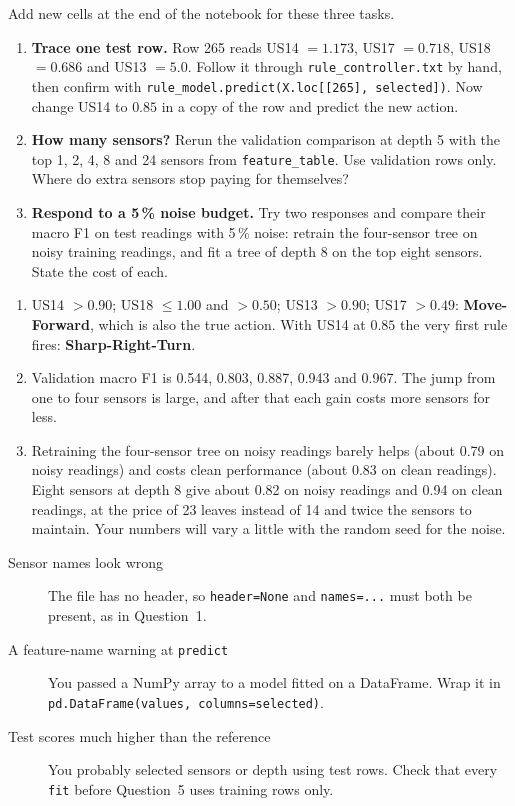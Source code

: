 \begin{yourturn}
Add new cells at the end of the notebook for these three tasks.
\begin{enumerate}
  \item \textbf{Trace one test row.} Row 265 reads US14 $=1.173$, US17 $=0.718$, US18 $=0.686$ and US13 $=5.0$. Follow it through \texttt{rule\_controller.txt} by hand, then confirm with \texttt{rule\_model.predict(X.loc[[265], selected])}. Now change US14 to $0.85$ in a copy of the row and predict the new action.
  \item \textbf{How many sensors?} Rerun the validation comparison at depth 5 with the top 1, 2, 4, 8 and 24 sensors from \texttt{feature\_table}. Use validation rows only. Where do extra sensors stop paying for themselves?
  \item \textbf{Respond to a 5\,\% noise budget.} Try two responses and compare their macro F1 on test readings with 5\,\% noise: retrain the four-sensor tree on noisy training readings, and fit a tree of depth 8 on the top eight sensors. State the cost of each.
\end{enumerate}
\end{yourturn}

\begin{expectedfindings}
\begin{enumerate}
  \item US14 $>0.90$; US18 $\le1.00$ and $>0.50$; US13 $>0.90$; US17 $>0.49$: \textbf{Move-Forward}, which is also the true action. With US14 at $0.85$ the very first rule fires: \textbf{Sharp-Right-Turn}.
  \item Validation macro F1 is 0.544, 0.803, 0.887, 0.943 and 0.967. The jump from one to four sensors is large, and after that each gain costs more sensors for less.
  \item Retraining the four-sensor tree on noisy readings barely helps (about 0.79 on noisy readings) and costs clean performance (about 0.83 on clean readings). Eight sensors at depth 8 give about 0.82 on noisy readings and 0.94 on clean readings, at the price of 23 leaves instead of 14 and twice the sensors to maintain. Your numbers will vary a little with the random seed for the noise.
\end{enumerate}
\end{expectedfindings}

\begin{troubleshoot}
\begin{description}
  \item[Sensor names look wrong] The file has no header, so \texttt{header=None} and \texttt{names=...} must both be present, as in Question~1.
  \item[A feature-name warning at \texttt{predict}] You passed a NumPy array to a model fitted on a DataFrame. Wrap it in \texttt{pd.DataFrame(values, columns=selected)}.
  \item[Test scores much higher than the reference] You probably selected sensors or depth using test rows. Check that every \texttt{fit} before Question~5 uses training rows only.
\end{description}
\end{troubleshoot}

